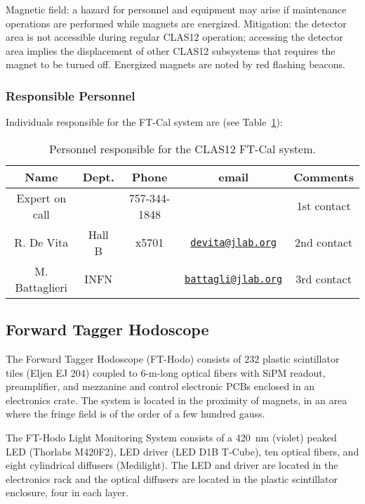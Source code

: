 Magnetic field: a hazard for personnel and equipment may arise if maintenance operations are 
performed while magnets are energized. Mitigation: the detector area is not accessible during 
regular CLAS12 operation; accessing the detector area implies the displacement of other CLAS12 
subsystems that requires the magnet to be turned off. Energized magnets are noted by red flashing 
beacons.

\vfil
\eject

\subsubsection{Responsible Personnel}

Individuals responsible for the FT-Cal system are (see Table~\ref{tb:ft-cal}):

\begin{table}[!htb]
\centering
\begin{tabular}{|c|c|c|c|c|} \hline
Name&Dept.&Phone&email&Comments \\ \hline
Expert on call&        & 757-344-1848 && 1st contact \\ \hline
R. De Vita    & Hall B &x5701&\href{mailto:devita@jlab.org}{\nolinkurl{devita@jlab.org}}& 2nd contact  \\ \hline
M. Battaglieri& INFN   & &\href{mailto:battagli@jlab.org}{\nolinkurl{battagli@jlab.org}}&3rd contact \\ \hline
\end{tabular}
\caption{Personnel responsible for the CLAS12 FT-Cal system.} 
\label{tb:ft-cal}
\end{table}

\subsection{Forward Tagger Hodoscope}

The Forward Tagger Hodoscope (FT-Hodo) consists of $232$ plastic scintillator tiles (Eljen 
EJ 204) coupled to 6-m-long optical fibers with SiPM readout, preamplifier, and mezzanine 
and control electronic PCBs enclosed in an electronics crate. The system is located in the 
proximity of magnets, in an area where the fringe field is of the order of a few hundred gauss.

The FT-Hodo Light Monitoring System consists of a 420~nm (violet) peaked LED (Thorlabs M420F2), 
LED driver (LED D1B T-Cube), ten optical fibers, and eight cylindrical diffusers (Medilight). 
The LED and driver are located in the electronics rack and the optical diffusers are located 
in the plastic scintillator enclosure, four in each layer.

